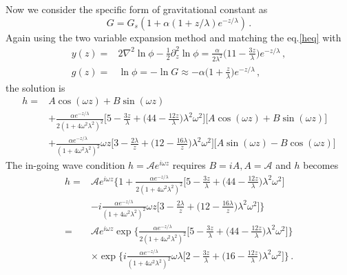 \documentclass[
 jor,
 amsmath,amssymb,preprint,
]{revtex4-2}
\begin{document}
Now we consider the specific form of gravitational constant as
\begin{equation}
G = G_s(1+\alpha(1+z/\lambda) e^{-z/\lambda})\,.
\end{equation}
Again using the two variable expansion method and matching the eq.\eqref{heq} with
\begin{align}
y(z) = & 2\nabla^2\ln\phi - \frac{1}{2}\partial_z^2\ln\phi = \frac{\alpha}{2\lambda^2}\bigg( 11 - \frac{3z}{\lambda} \bigg) e^{-z/\lambda}\,,\\
g(z) = & \ln\phi = -\ln G \approx - \alpha\bigg(1+\frac{z}{\lambda}\bigg)e^{-z/\lambda}\,,
\end{align}
the solution is 
\begin{equation}
\begin{aligned}
h = & A\cos(\omega z) + B\sin(\omega z) \\
& + \frac{\alpha e^{-z/\lambda}}{2(1+4\omega^2\lambda^2)^2}\bigg[ 5 - \frac{3z}{\lambda} + \bigg(44 - \frac{12z}{\lambda}\bigg) \lambda^2\omega^2 \bigg]\big[ A\cos(\omega z) + B\sin(\omega z) \big]  \\
& + \frac{\alpha e^{-z/\lambda}}{(1+4\omega^2\lambda^2)^2}\omega z \bigg[ 3 - \frac{2\lambda}{z} + \bigg(12 - \frac{16\lambda}{z} \bigg) \lambda^2\omega^2 \bigg] \big[A\sin(\omega z) - B\cos(\omega z)\big]
\end{aligned}
\end{equation}
The in-going wave condition $h = \mathcal{A}e^{i\omega z}$ requires $B = iA, A = \mathcal{A}$ and $h$ becomes
\begin{equation}
\begin{aligned}
h = & \mathcal{A}e^{i\omega z}\bigg\{ 1 + \frac{\alpha e^{-z/\lambda}}{2(1+4\omega^2\lambda^2)^2} \bigg[ 5 - \frac{3z}{\lambda} + \bigg(44 - \frac{12z}{\lambda}\bigg) \lambda^2\omega^2 \bigg] \\
&  - i \frac{\alpha e^{-z/\lambda}}{(1+4\omega^2\lambda^2)^2}\omega z \bigg[ 3 - \frac{2\lambda}{z} + \bigg(12 - \frac{16\lambda}{z} \bigg) \lambda^2\omega^2 \bigg] \bigg\} \\
= & \mathcal{A}e^{i\omega z} \exp\bigg\{ \frac{\alpha e^{-z/\lambda}}{2(1+4\omega^2\lambda^2)^2} \bigg[ 5 - \frac{3z}{\lambda} + \bigg(44 - \frac{12z}{\lambda}\bigg) \lambda^2\omega^2 \bigg] \bigg\} \\
& \times \exp\bigg\{ i \frac{\alpha e^{-z/\lambda}}{(1+4\omega^2\lambda^2)^2}\omega\lambda \bigg[ 2 -\frac{3z}{\lambda} + \bigg(16 - \frac{12z}{\lambda} \bigg) \lambda^2\omega^2 \bigg] \bigg\} \,.
\end{aligned}
\end{equation}
\end{document}
